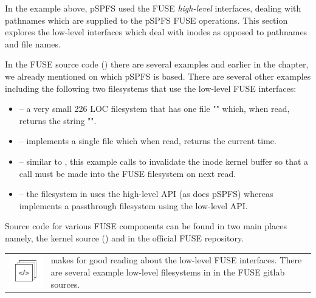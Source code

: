 In the example above, pSPFS used the FUSE \textit{high-level} interfaces, dealing with pathnames which are supplied to the pSPFS FUSE operations. This section explores the low-level interfaces which deal with inodes as opposed to pathnames and file names.

In the FUSE source code () there are several examples and earlier in the chapter, we already mentioned  on which pSPFS is based. There are several other examples including the following two filesystems that use the low-level FUSE interfaces:

\begin{itemize}
	\item {} -- a very small 226 LOC filesystem that has one file "" which, when read, returns the string
		"".
	\item {} -- implements a single file which when read, returns the current time.
	\item {} -- similar to , this example calls 
		 to invalidate the inode kernel buffer so that a call must
		be made into the FUSE filesystem on next read.
	\item {} -- the filesystem in  uses the high-level API (as does pSPFS) whereas 
		 implements a passthrough filesystem using the low-level API.
\end{itemize}

\noindent 
Source code for various FUSE components can be found in two main places namely, the kernel source () and in the official FUSE repository.

\begin{table}[h]
\begin{tabular}{ll}
\parbox[l]{0.6in}{\includegraphics[scale=0.8]{figures/src-xref.pdf}} & \parbox[l]{4in}{\small{ makes for good reading} about the low-level FUSE interfaces. There are several example low-level filesystems in  in the FUSE gitlab sources.}
\end{tabular}
\end{table}

